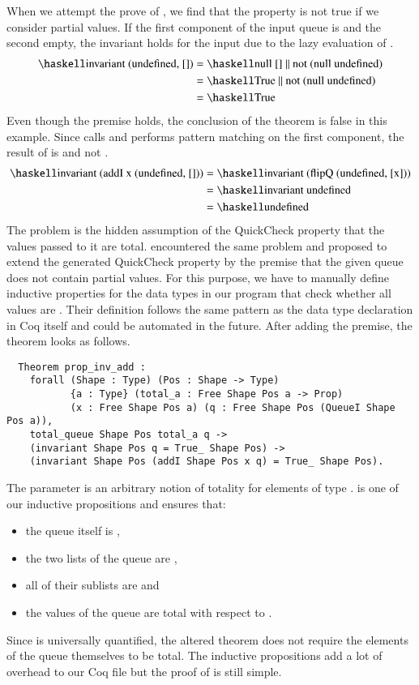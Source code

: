 When we attempt the prove of , we find that the property is not true if we consider partial values.
If the first component of the input queue is  and the second empty, the invariant holds for the input due to the lazy evaluation of \haskell{(||)}.
\begin{align*}
  \haskellM{invariant (undefined, [])}
  &= \haskellM{null [] || not (null undefined)} \\
  &= \haskellM{True || not (null undefined)} \\
  &= \haskellM{True}
\end{align*}
Even though the premise holds, the conclusion of the theorem is false in this example.
Since  calls  and  performs pattern matching on the first component, the result of  is  and not .
\begin{align*}
  \haskellM{invariant (addI x (undefined, []))}
  &= \haskellM{invariant (flipQ (undefined, [x]))} \\
  &= \haskellM{invariant undefined} \\
  &= \haskellM{undefined}
\end{align*}
The problem is the hidden assumption of the QuickCheck property that the values passed to it are total.
\citet[p.~20]{Dylus:2018} encountered the same problem and proposed to extend the generated QuickCheck property by the premise that the given queue does not contain partial values.
For this purpose, we have to manually define inductive properties for the data types in our program that check whether all values are .
Their definition follows the same pattern as the data type declaration in Coq itself and could be automated in the future.
After adding the premise, the theorem looks as follows.
\begin{verbatim}
  Theorem prop_inv_add :
    forall (Shape : Type) (Pos : Shape -> Type)
           {a : Type} (total_a : Free Shape Pos a -> Prop)
           (x : Free Shape Pos a) (q : Free Shape Pos (QueueI Shape Pos a)),
    total_queue Shape Pos total_a q ->
    (invariant Shape Pos q = True_ Shape Pos) ->
    (invariant Shape Pos (addI Shape Pos x q) = True_ Shape Pos).
\end{verbatim}
The parameter  is an arbitrary notion of totality for elements of type .
 is one of our inductive propositions and ensures that:
\begin{itemize}
  \item the queue itself is ,
  \item the two lists of the queue are ,
  \item all of their sublists are  and
  \item the values of the queue are total with respect to .
\end{itemize}
Since  is universally quantified, the altered theorem does not require the elements of the queue themselves to be total.
The inductive propositions add a lot of overhead to our Coq file but the proof of  is still simple.

